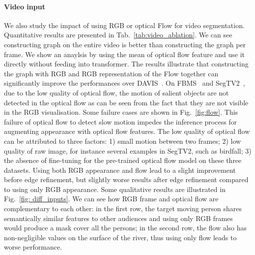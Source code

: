 \documentclass[twocolumn]{article}
\begin{document}
\paragraph*{Video input} 
We also study the impact of using RGB or optical Flow for video segmentation.  Quantitative results are presented in Tab.~\ref{tab:video_ablation}. We can see constructing graph on the entire video is better than constructing the graph per frame. We show an anaylsis by using the mean of optical flow feature and use it directly without feeding into transformer. The results illustrate that constructing the graph with RGB and RGB representation of the Flow together can significantly improve the performances over DAVIS~\cite{perazzi2016benchmark}. On FBMS~\cite{ochs2013segmentation} and SegTV2~\cite{li2013video}, due to the low quality of optical flow, the motion of salient objects are not detected in the optical flow as can be seen from the fact that they are not visible in the RGB visualisation. Some failure cases are shown in Fig.~\ref{fig:flow}. This failure of optical flow to detect slow motion impedes the inference process for augmenting appearance with optical flow features. The low quality of optical flow can be attributed to three factors: 1) small motion between two frames; 2) low quality of raw image, for instance several examples in SegTV2, such as birdfall; 3) the absence of fine-tuning for the pre-trained optical flow model on these three datasets.
Using both RGB appearance and flow lead to a slight improvement before  edge refinement, but slightly worse results  after edge refinement compared to using only RGB appearance. Some qualitative results are illustrated in Fig.~\ref{fig: diff_inputs}. We can see how RGB frame and optical flow are complementary to each other: in the first row, the target moving person shares semantically similar features to other audiences and using only RGB frames would produce a mask cover all the persons; in the second row, the flow also has non-negligible values on the surface of the river, thus using only flow leads to worse performance. 


\begin{table}[!t]
\begin{center}
\caption{\textbf{Analysis of video graph.} We report Jaccard index~() for video segmentation on DAVIS~\cite{perazzi2016benchmark} with different video graphs. ``single frame'' represent creating the graph for each frame separately. }   
\label{tab: graph_building}
\end{center}
\end{table}
\end{document}
